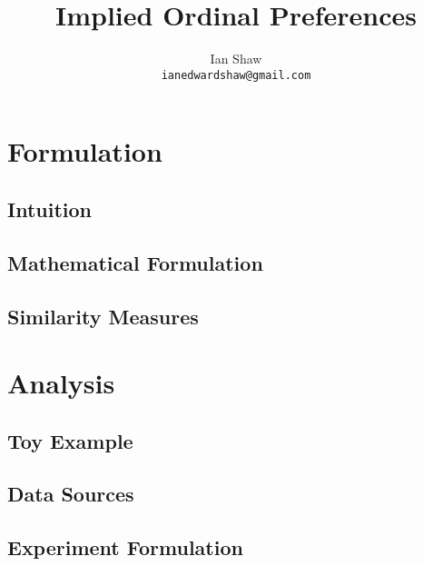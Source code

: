 \documentclass{article}
\title{Implied Ordinal Preferences}
\author{Ian Shaw \\ \texttt{ianedwardshaw@gmail.com}}
\begin{document}
\maketitle

\begin{abstract}

\end{abstract}


\newpage

\tableofcontents

\newpage

\section{Formulation}

\subsection{Intuition}



\subsection{Mathematical Formulation}



\subsection{Similarity Measures}



\section{Analysis}

\subsection{Toy Example}



\subsection{Data Sources}



\subsection{Experiment Formulation}
\end{document}
